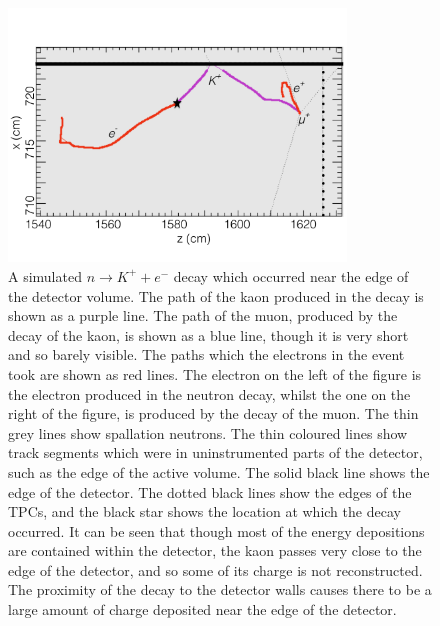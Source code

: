 \begin{figure}
  \centering
  \includegraphics[width=0.8\textwidth]{NearEdgeDecay}
  \caption[A simulated $n \rightarrow K^{+} + e^{-}$ decay which occurred near the edge of the detector volume]
          {A simulated $n \rightarrow K^{+} + e^{-}$ decay which occurred near the edge of the detector volume. The path of the kaon produced in the decay is shown as a purple line. The path of the muon, produced by the decay of the kaon, is shown as a blue line, though it is very short and so barely visible. The paths which the electrons in the event took are shown as red lines. The electron on the left of the figure is the electron produced in the neutron decay, whilst the one on the right of the figure, is produced by the decay of the muon. The thin grey lines show spallation neutrons. The thin coloured lines show track segments which were in uninstrumented parts of the detector, such as the edge of the active volume. The solid black line shows the edge of the detector. The dotted black lines show the edges of the TPCs, and the black star shows the location at which the decay occurred. It can be seen that though most of the energy depositions are contained within the detector, the kaon passes very close to the edge of the detector, and so some of its charge is not reconstructed. The proximity of the decay to the detector walls causes there to be a large amount of charge deposited near the edge of the detector.}
  \label{fig:NDK_Sig_KENearEdge}
\end{figure}


